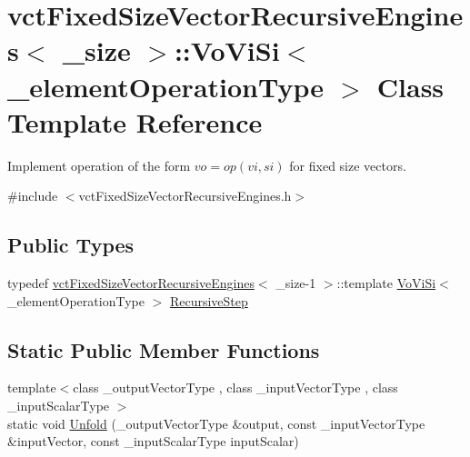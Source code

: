 \hypertarget{classvct_fixed_size_vector_recursive_engines_1_1_vo_vi_si}{}\section{vct\+Fixed\+Size\+Vector\+Recursive\+Engines$<$ \+\_\+size $>$\+:\+:Vo\+Vi\+Si$<$ \+\_\+element\+Operation\+Type $>$ Class Template Reference}
\label{classvct_fixed_size_vector_recursive_engines_1_1_vo_vi_si}


Implement operation of the form $vo = op(vi, si)$ for fixed size vectors.  




{\ttfamily \#include $<$vct\+Fixed\+Size\+Vector\+Recursive\+Engines.\+h$>$}

\subsection*{Public Types}
\begin{DoxyCompactItemize}
\item 
typedef \hyperlink{classvct_fixed_size_vector_recursive_engines}{vct\+Fixed\+Size\+Vector\+Recursive\+Engines}$<$ \+\_\+size-\/1 $>$\+::template \hyperlink{classvct_fixed_size_vector_recursive_engines_1_1_vo_vi_si}{Vo\+Vi\+Si}$<$ \+\_\+element\+Operation\+Type $>$ \hyperlink{classvct_fixed_size_vector_recursive_engines_1_1_vo_vi_si_accec4105549a16640771c23dad79ac30}{Recursive\+Step}
\end{DoxyCompactItemize}
\subsection*{Static Public Member Functions}
\begin{DoxyCompactItemize}
\item 
{\footnotesize template$<$class \+\_\+output\+Vector\+Type , class \+\_\+input\+Vector\+Type , class \+\_\+input\+Scalar\+Type $>$ }\\static void \hyperlink{classvct_fixed_size_vector_recursive_engines_1_1_vo_vi_si_a77d53351e3af513b9aab368e14ca65ea}{Unfold} (\+\_\+output\+Vector\+Type \&output, const \+\_\+input\+Vector\+Type \&input\+Vector, const \+\_\+input\+Scalar\+Type input\+Scalar)
\end{DoxyCompactItemize}


